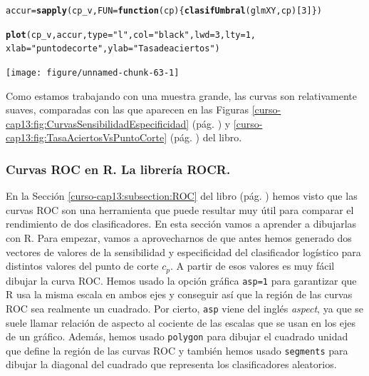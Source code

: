 \documentclass[10pt,a4paper]{article}\usepackage[]{graphicx}\usepackage[]{color}
\makeatletter
\newcommand{\hlnum}[1]{\textcolor[rgb]{0.686,0.059,0.569}{#1}}%
\newcommand{\hlstr}[1]{\textcolor[rgb]{0.192,0.494,0.8}{#1}}%
\newcommand{\hlstd}[1]{\textcolor[rgb]{0.345,0.345,0.345}{#1}}%
\newcommand{\hlkwa}[1]{\textcolor[rgb]{0.161,0.373,0.58}{\textbf{#1}}}%
\newcommand{\hlkwb}[1]{\textcolor[rgb]{0.69,0.353,0.396}{#1}}%
\newcommand{\hlkwc}[1]{\textcolor[rgb]{0.333,0.667,0.333}{#1}}%
\newcommand{\hlkwd}[1]{\textcolor[rgb]{0.737,0.353,0.396}{\textbf{#1}}}%
\newenvironment{kframe}{%
 \def\at@end@of@kframe{}%
 \ifinner\ifhmode%
  \def\at@end@of@kframe{\end{minipage}}%
  \begin{minipage}{\columnwidth}%
 \fi\fi%
 \def\FrameCommand##1{\hskip\@totalleftmargin \hskip-\fboxsep
 \colorbox{shadecolor}{##1}\hskip-\fboxsep
     \hskip-\linewidth \hskip-\@totalleftmargin \hskip\columnwidth}%
 \MakeFramed {\advance\hsize-\width
   \@totalleftmargin\z@ \linewidth\hsize
   \@setminipage}}%
 {\par\unskip\endMakeFramed%
 \at@end@of@kframe}
\newenvironment{knitrout}{}{} %
\makeatother
\begin{document}
\begin{knitrout}
\color{fgcolor}\begin{kframe}
\begin{alltt}
\hlstd{accur} \hlkwb{=} \hlkwd{sapply}\hlstd{(cp_v,} \hlkwc{FUN} \hlstd{=} \hlkwa{function}\hlstd{(}\hlkwc{cp}\hlstd{)\{}\hlkwd{clasifUmbral}\hlstd{(glmXY, cp)[}\hlnum{3}\hlstd{]\})}

\hlkwd{plot}\hlstd{(cp_v, accur,} \hlkwc{type}\hlstd{=}\hlstr{"l"}\hlstd{,} \hlkwc{col}\hlstd{=}\hlstr{"black"}\hlstd{,} \hlkwc{lwd}\hlstd{=}\hlnum{3}\hlstd{,} \hlkwc{lty}\hlstd{=}\hlnum{1}\hlstd{,}
     \hlkwc{xlab}\hlstd{=}\hlstr{"punto de corte"}\hlstd{,} \hlkwc{ylab}\hlstd{=}\hlstr{"Tasa de aciertos"}\hlstd{)}
\end{alltt}
\end{kframe}

{\centering \texttt{[image: figure/unnamed-chunk-63-1]} 

}



\end{knitrout}

Como estamos trabajando con una muestra grande, las curvas son relativamente suaves, comparadas con las que aparecen en las Figuras \ref{curso-cap13:fig:CurvasSensibilidadEspecificidad} (pág. \pageref{curso-cap13:fig:CurvasSensibilidadEspecificidad}) y \ref{curso-cap13:fig:TasaAciertosVsPuntoCorte} (pág. \pageref{curso-cap13:fig:TasaAciertosVsPuntoCorte}) del libro.

\subsubsection*{Curvas ROC en R. La librería ROCR.}

En la Sección \ref{curso-cap13:subsection:ROC} del libro (pág. \pageref{curso-cap13:subsection:ROC}) hemos visto que las curvas ROC son una herramienta que puede resultar muy útil para comparar el rendimiento de dos clasificadores. En esta sección vamos a aprender a dibujarlas con R. Para empezar, vamos a aprovecharnos de  que antes hemos generado dos vectores de valores de la sensibilidad y especificidad del clasificador logístico para distintos valores del punto de corte $c_p$. A partir de esos valores es muy fácil dibujar la curva ROC.  Hemos usado la opción gráfica {\tt asp=1}  para garantizar que R usa la misma escala en ambos ejes y conseguir así que la región de las curvas ROC sea realmente un cuadrado. Por cierto, {\tt asp} viene del inglés {\em aspect}, ya que se suele llamar {\sf relación de aspecto} al cociente de las escalas que se usan en los ejes de un gráfico. Además, hemos usado {\tt polygon} para dibujar el cuadrado unidad que define la región de las curvas ROC y también hemos usado {\tt segments} para dibujar la diagonal del cuadrado que representa los clasificadores aleatorios.
\end{document}
